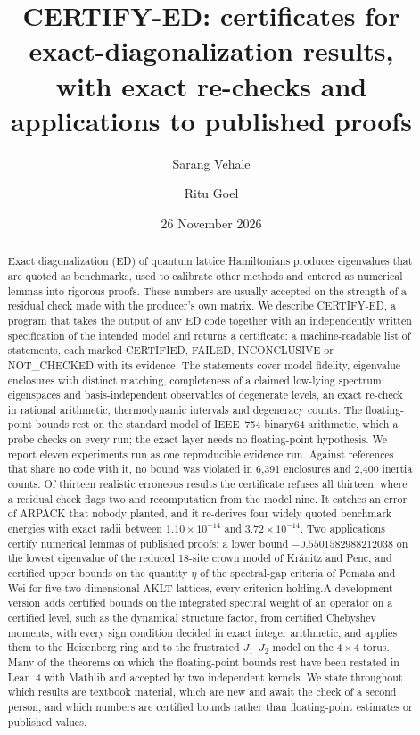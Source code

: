 \documentclass[11pt,a4paper]{article}
\title{CERTIFY-ED: certificates for exact-diagonalization results,\\
with exact re-checks and applications to published proofs}
\author{Sarang Vehale \and Ritu Goel}
\date{26 November 2026}
\newif\ifshowSone
\newcommand{\status}[1]{\textsf{#1}}
\newcommand{\CERT}{\status{CERTIFIED}}
\newcommand{\FAIL}{\status{FAILED}}
\newcommand{\INC}{\status{INCONCLUSIVE}}
\newcommand{\NC}{\status{NOT\_CHECKED}}
\begin{document}
\maketitle

\begin{abstract}
Exact diagonalization (ED) of quantum lattice Hamiltonians produces eigenvalues that are quoted as benchmarks, used to
calibrate other methods and entered as numerical lemmas into rigorous proofs. These numbers are usually accepted on the
strength of a residual check made with the producer's own matrix. We describe CERTIFY-ED, a program that takes the
output of any ED code together with an independently written specification of the intended model and returns a
certificate: a machine-readable list of statements, each marked \CERT, \FAIL, \INC{} or \NC{} with its evidence. The
statements cover model fidelity, eigenvalue enclosures with distinct matching, completeness of a claimed low-lying
spectrum, eigenspaces and basis-independent observables of degenerate levels, an exact re-check in rational
arithmetic, thermodynamic intervals and degeneracy counts. The floating-point bounds rest on the standard model of
IEEE~754 binary64 arithmetic, which a probe checks on every run; the exact layer needs no floating-point hypothesis. We
report eleven experiments run as one reproducible evidence run. Against references that share no code with it, no
bound was violated in 6,391 enclosures and 2,400 inertia counts. Of thirteen realistic erroneous results the
certificate refuses all thirteen, where a residual check flags two and recomputation from the model nine. It catches
an error of ARPACK that nobody planted, and it re-derives four widely quoted benchmark energies with exact radii
between $1.10\times10^{-14}$ and $3.72\times10^{-14}$. Two applications certify numerical lemmas of published proofs:
a lower bound $-0.5501582988212038$ on the lowest eigenvalue of the reduced 18-site crown model of Kr\'anitz and
Penc, and certified upper bounds on the quantity $\eta$ of the spectral-gap criteria of Pomata and Wei for five
two-dimensional AKLT lattices, every criterion holding.\ifshowSone{} For spin~1 the same crown cluster has, at the
published couplings, an eigenvalue certified at or below $-1.6380246$, which is $5.0\times10^{-3}$ below the published
spin-1 bound, in an outer-pair configuration that the published search did not include.\fi A development version adds certified bounds on the integrated
spectral weight of an operator on a certified level, such as the dynamical structure factor, from certified Chebyshev
moments, with every sign condition decided in exact integer arithmetic, and applies them to the
Heisenberg ring and to the frustrated $J_1$--$J_2$ model on the $4\times4$ torus. Many of the theorems on which the
floating-point bounds rest have been restated in Lean~4 with Mathlib and accepted by two independent kernels. We state throughout which results are textbook material,
which are new and await the check of a second person, and which numbers are certified bounds rather than
floating-point estimates or published values.
\end{abstract}
\end{document}
